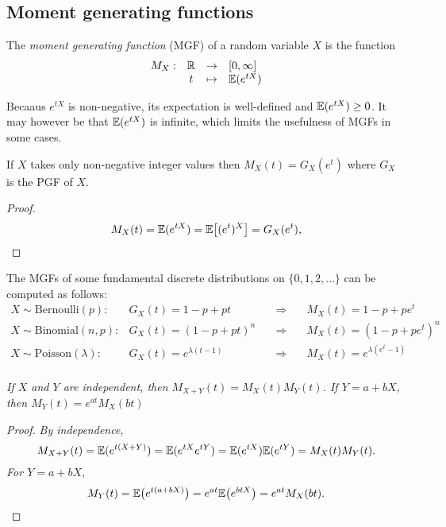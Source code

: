 \subsection{Moment generating functions}

\begin{definition}
The \emph{moment generating function} (MGF) of a random variable $X$ is the function 
\[
\begin{array}{rccl}
M_X:	& \mathbb{R}	& \to		& [0,\infty] \\
		& t		& \mapsto	& \mathbb{E}(e^{tX})
\end{array}
\]
\end{definition}

Becaaus $e^{tX}$ is non-negative, its expectation is well-defined and $\mathbb{E}(e^{tX})\geq 0$. It may however be that $\mathbb{E}(e^{tX})$ is infinite, which limits the usefulness of MGFs in some cases.

\begin{theorem}
If $X$ takes only non-negative integer values then $M_X(t) = G_X(e^t)$ where $G_X$ is the PGF of $X$.
\end{theorem}
\begin{proof}
\[
M_X(t) = \mathbb{E}(e^{tX}) = \mathbb{E}\big[(e^t)^X\big] = G_X(e^t),
\]
\end{proof}

\begin{example}
The MGFs of some fundamental discrete distributions on $\{0,1,2,\ldots\}$ can be computed as follows:
\[
\begin{array}{llll}
X\sim\text{Bernoulli}(p):\quad	& G_X(t) = 1 - p + pt\quad	&\quad\Rightarrow\quad & M_X(t) =  1 - p + pe^t		\\[2ex]
X\sim\text{Binomial}(n,p):		& G_X(t) = (1-p+pt)^n			&\quad\Rightarrow\quad & M_X(t) = (1 - p + pe^t)^n	\\[2ex]
X\sim\text{Poisson}(\lambda):	& G_X(t) = e^{\lambda(t-1)}	&\quad\Rightarrow\quad & M_X(t) = e^{\lambda(e^t-1)}	\\ 
\end{array}
\]
\end{example}


\begin{theorem}\label{thm:props_mgfs}
\ben
\it If $X$ and $Y$ are independent, then $M_{X+Y}(t) = M_X(t)M_Y(t)$.
\it If $Y = a + bX$, then $M_Y(t) = e^{at} M_X(bt)$
\een
\begin{proof}
\ben
\it By independence, 
\[
M_{X+Y}(t) = \mathbb{E}(e^{t(X+Y)}) = \mathbb{E}(e^{tX}e^{tY}) = \mathbb{E}(e^{tX})\mathbb{E}(e^{tY}) = M_X(t)M_Y(t).
\]
\it For $Y=a+bX$, 
\[
M_Y(t) = \mathbb{E}\big(e^{t(a+bX)}\big) = e^{at}\mathbb{E}\big(e^{btX}\big) = e^{at}M_X(bt).
\]
\een
\end{proof}
\end{theorem}

